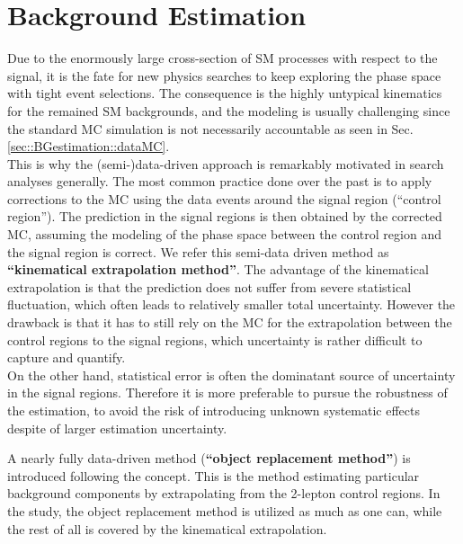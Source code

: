 \chapter{Background Estimation} \label{sec::BGestimation}
Due to the enormously large cross-section of SM processes with respect to the signal,
it is the fate for new physics searches to keep exploring the phase space with tight event selections.
The consequence is the highly untypical kinematics for the remained SM backgrounds, and the modeling is usually challenging since the standard MC simulation is not necessarily accountable as seen in Sec. \ref{sec::BGestimation::dataMC}. \\

This is why the (semi-)data-driven approach is remarkably motivated in search analyses generally. 
The most common practice done over the past is to apply corrections to the MC using the data events around the signal region (``control region''). 
The prediction in the signal regions is then obtained by the corrected MC, assuming the modeling of the phase space between the control region and the signal region is correct. 
We refer this semi-data driven method as \textbf{``kinematical extrapolation method''}. 
The advantage of the kinematical extrapolation is that the prediction does not suffer from severe statistical fluctuation, which often leads to relatively smaller total uncertainty. 
However the drawback is that it has to still rely on the MC for the extrapolation between the control regions to the signal regions, which uncertainty is rather difficult to capture and quantify. \\

On the other hand, statistical error is often the dominatant source of uncertainty in the signal regions.
Therefore it is more preferable to pursue the robustness of the estimation, to avoid the risk of introducing unknown systematic effects despite of larger estimation uncertainty.

A nearly fully data-driven method (\textbf{``object replacement method''}) is introduced following the concept.
This is the method estimating particular background components by extrapolating from the 2-lepton control regions.
In the study, the object replacement method is utilized as much as one can, while the rest of all is covered by the kinematical extrapolation. \\
%


